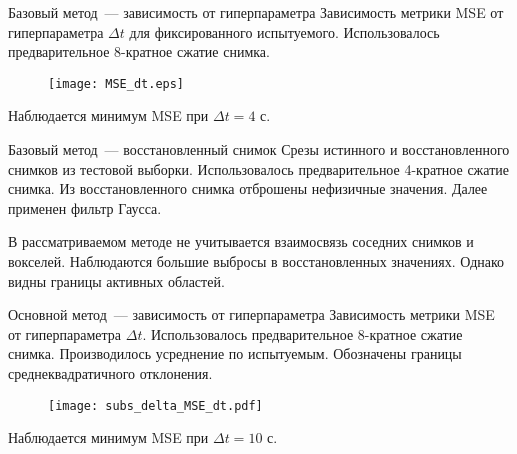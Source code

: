 \documentclass{beamer}
\begin{document}
\begin{frame}{Базовый метод~--- зависимость от гиперпараметра}
    Зависимость метрики MSE от гиперпараметра $\Delta t$ для фиксированного испытуемого.
    Использовалось предварительное 8-кратное сжатие снимка.
    \begin{figure}
        \centering
        \texttt{[image: MSE\_dt.eps]}
    \end{figure}
    Наблюдается минимум MSE при $\Delta t = 4 \text{ с}$.
\end{frame}
\begin{frame}{Базовый метод~--- восстановленный снимок}
    Срезы истинного и восстановленного снимков из тестовой выборки.
    Использовалось предварительное 4-кратное сжатие снимка.
    Из восстановленного снимка отброшены нефизичные значения.
    Далее применен фильтр Гаусса.
    \begin{figure}[h!]
		\centering
		\hfill
		\hfill
		\label{fig:1}
	\end{figure}
    В рассматриваемом методе не учитывается взаимосвязь соседних снимков и вокселей.
    Наблюдаются большие выбросы в восстановленных значениях.
    Однако видны границы активных областей.
\end{frame}
\begin{frame}{Основной метод~--- зависимость от гиперпараметра}
    Зависимость метрики MSE от гиперпараметра $\Delta t$.
    Использовалось предварительное 8-кратное сжатие снимка.
    Производилось усреднение по испытуемым.
	Обозначены границы среднеквадратичного отклонения.
    \begin{figure}[h!]
		\centering
		\texttt{[image: subs\_delta\_MSE\_dt.pdf]}
		\label{fig:3}
	\end{figure}
    Наблюдается минимум MSE при $\Delta t = 10 \text{ с}$.
\end{frame}
\end{document}
